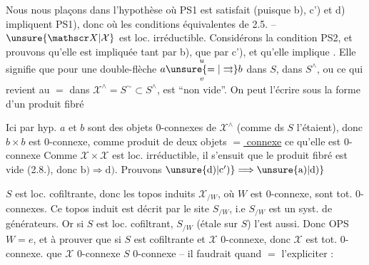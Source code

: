 
Nous nous plaçons  dans l'hypothèse où PS1 est satisfait (puisque b), c') et d) impliquent PS1), donc où  les conditions équivalentes de 2.5. -- $\unsure{\mathscr X|\mathcal X}$ est loc. irréductible. Considérons  la condition PS2, et prouvons qu'elle est impliquée tant par b), que par c'), et qu'elle implique . Elle signifie que pour une double-flèche $a\overset{u}{\underset{v}{\unsure{=|\rightrightarrows}}}b$ dans $S$,    dans $S^\wedge$, ou ce qui revient au $=$ dans $\mathscr X^\wedge=S^\sim\subset S^\wedge$, est ``non vide''. On peut l'écrire sous la forme d'un produit fibré


Ici par hyp. $a$ et $b$ sont des objets $0$-connexes de $\mathscr X^\wedge$ (comme ds $S$ l'étaient),   donc $b\times b$ est  $0$-connexe, comme produit de deux objets   \uline{$=$  connexe} ce qu'elle est  $0$-connexe\unsure{;} Comme $\mathscr X\times\mathscr X$ est loc. irréductible, il s'ensuit que le produit fibré est  vide (2.8.), donc $\mathrm{b)}\Longrightarrow\mathrm{d)}$. Prouvons $\unsure{\mathrm{d)}|\mathrm{c')}}\Longrightarrow\unsure{\mathrm{a)}|\mathrm{d)}}$  


$S$ est  loc. cofiltrante, donc  les topos induits $\mathscr X_{/W}$, où $W$ est $0$-connexe, sont tot. $0$-connexes. Ce topos induit est décrit par le site $S_{/W}$, i.e $S_{/W}$ est un syst. de générateurs. Or si $S$ est loc. cofiltrant, $S_{/W}$ (étale sur $S$) l'est aussi. Donc  OPS $W=e$, et à prouver que si $S$ est  cofiltrante et $\mathscr X$ $0$-connexe, donc $\mathscr X$ est tot. $0$-connexe.     que $\mathscr X$ $0$-connexe  $S$ $0$-connexe -- il faudrait quand $=$ l'expliciter :

